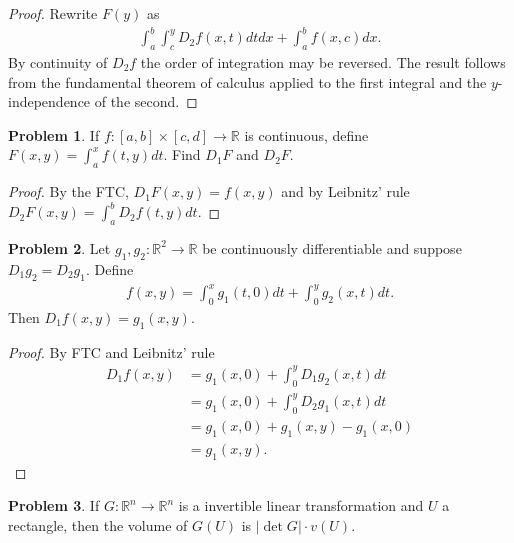 \documentclass[20pt]{article}
\theoremstyle{plain}
\theoremstyle{definition}
\newtheorem*{problem}{Problem}
\newcommand{\reals}{\mathbb{R}}
\begin{document}
\begin{proof}
  Rewrite $F(y)$ as 
  \begin{align*}
    \int_a^b \int_c^y D_2f(x, t)dtdx + \int_a^b f(x, c) dx.
  \end{align*}
  By continuity of $D_2f$ the order of integration may be reversed.
  The result follows from the fundamental theorem of calculus applied to the
  first integral and the $y$-independence of the second.
\end{proof}


\begin{problem}{3.33}
  If $f:[a, b] \times [c, d] \to \reals$ is continuous, define
  $F(x, y) = \int_a^xf(t, y)dt.$ Find $D_1F$ and $D_2F$.
\end{problem}

\begin{proof}
  By the FTC, $D_1F(x, y) = f(x, y)$ and by Leibnitz' rule $D_2F(x, y) = \int_a^bD_2f(t, y)dt.$
\end{proof}





\begin{problem}{3.34}
  Let $g_1, g_2: \reals^2 \to \reals$ be continuously differentiable and 
  suppose $D_1g_2 = D_2g_1.$  Define 
  \begin{align*}
    f(x, y) = \int_0^x g_1(t, 0)dt + \int_0^yg_2(x, t)dt.
  \end{align*}
  Then $D_1f(x, y) = g_1(x, y).$
\end{problem}

\begin{proof}
  By FTC and Leibnitz' rule
  \begin{align*}
    D_1f(x, y)
    &= g_1(x, 0) + \int_0^yD_1g_2(x, t)dt \\
    &= g_1(x, 0) + \int_0^yD_2g_1(x, t)dt \\
    &= g_1(x, 0) + g_1(x, y) - g_1(x, 0) \\
    &= g_1(x, y).
  \end{align*}
\end{proof}



\begin{problem}{3.35}
  If $G: \reals^n \to \reals^n$ is a invertible linear transformation and $U$ a 
  rectangle, then the volume of $G(U)$ is $|\det G|\cdot v(U).$
\end{problem}
\end{document}
